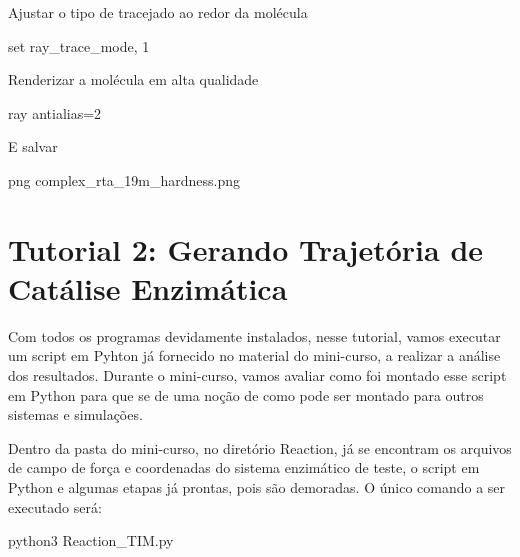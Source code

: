 \documentclass[a4paper,11pt]{refart}
\begin{document}
	Ajustar o tipo de tracejado ao redor da molécula 
	
	
	\hspace*{-\leftmarginwidth}
	\begin{minipage}{\fullwidth}
		\begin{pymol}set ray_trace_mode, 1\end{pymol}
	\end{minipage}

	Renderizar a molécula em alta qualidade

	\hspace*{-\leftmarginwidth}
	\begin{minipage}{\fullwidth}
		\begin{pymol}ray antialias=2\end{pymol}
	\end{minipage}

	E salvar 
	
	\hspace*{-\leftmarginwidth}
	\begin{minipage}{\fullwidth}
		\begin{pymol}png complex_rta_19m_hardness.png\end{pymol}
	\end{minipage}

	
	\section{Tutorial 2: Gerando Trajetória de Catálise Enzimática} 
	
	Com todos os programas devidamente instalados, nesse tutorial, vamos executar um script em Pyhton já fornecido no material do mini-curso, a realizar a análise dos resultados. Durante o mini-curso, vamos avaliar como foi montado esse script em Python para que se de uma noção de como pode ser montado para outros sistemas e simulações. 
	
	Dentro da pasta do mini-curso, no diretório Reaction, já se encontram os arquivos de campo de força e coordenadas do sistema enzimático de teste, o script em Python e algumas etapas já prontas, pois são demoradas. O único comando a ser executado será: 
	
	\hspace*{-\leftmarginwidth}
	\begin{minipage}{\fullwidth}
		\begin{commandshell}python3 Reaction_TIM.py\end{commandshell}
	\end{minipage}
	
\end{document}
